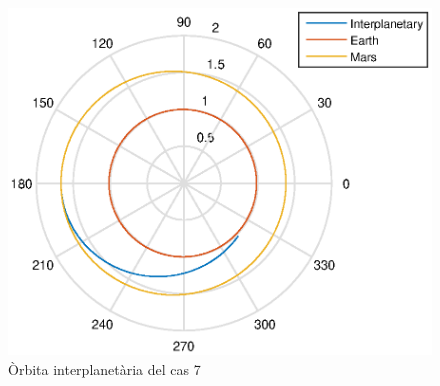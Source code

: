 \begin{figure}[H]
	\centering
	\includegraphics[scale=0.8]{./plots/cas7}
	\caption{Òrbita interplanetària del cas 7}
\end{figure}

